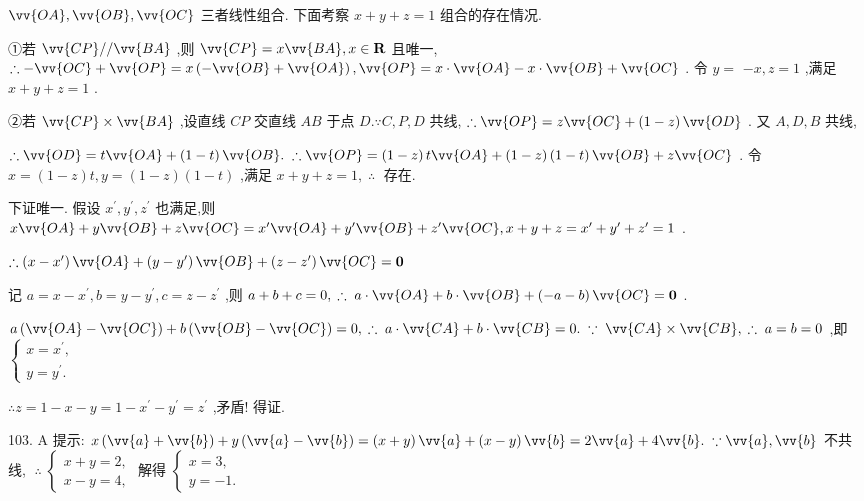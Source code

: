 $\vv{OA},\vv{OB},\vv{OC}$ 三者线性组合. 下面考察 $x + y + z = 1$ 组合的存在情况.

①若 $\vv{CP}//\vv{BA}$ ,则 $\vv{CP} = x\vv{BA},x \in  \mathbf{R}$ 且唯一, $\therefore  - \vv{OC} + \vv{OP} = x\left( {-\vv{OB} + \vv{OA}}\right) ,\vv{OP} = x \cdot  \vv{OA} - x \cdot  \vv{OB} + \vv{OC}$ . 令 $y =$  $- x,z = 1$ ,满足 $x + y + z = 1$ .

②若 $\vv{CP} \times  \vv{BA}$ ,设直线 ${CP}$ 交直线 ${AB}$ 于点 $D.\because C,P,D$ 共线, $\therefore \vv{OP} = z\vv{OC} + \left( {1 - z}\right) \vv{OD}$ . 又 $A,D,B$ 共线,

$\therefore \vv{OD} = t\vv{OA} + \left( {1 - t}\right) \vv{OB}.\;\therefore \vv{OP} = \left( {1 - z}\right) t\vv{OA} + \left( {1 - z}\right) \left( {1 - t}\right) \vv{OB} + z\vv{OC}$ . 令 $x = \left( {1 - z}\right) t,y = \left( {1 - z}\right) \left( {1 - t}\right)$ ,满足 $x + y + z = 1,\;\therefore \;$ 存在.

下证唯一. 假设 ${x}^{\prime },{y}^{\prime },{z}^{\prime }$ 也满足,则 $x\vv{OA} + y\vv{OB} + z\vv{OC} = {x}^{\prime }\vv{OA} + {y}^{\prime }\vv{OB} + {z}^{\prime }\vv{OC},x + y + z = {x}^{\prime } + {y}^{\prime } + {z}^{\prime } = 1$ .

$\therefore \left( {x - {x}^{\prime }}\right) \vv{OA} + \left( {y - {y}^{\prime }}\right) \vv{OB} + \left( {z - {z}^{\prime }}\right) \vv{OC} = \mathbf{0}$

记 $a = x - {x}^{\prime },b = y - {y}^{\prime },c = z - {z}^{\prime }$ ,则 $a + b + c = 0,\;\therefore \;a \cdot  \vv{OA} + b \cdot  \vv{OB} + \left( {-a - b}\right) \vv{OC} = \mathbf{0}$ .

$a\left( {\vv{OA} - \vv{OC}}\right)  + b\left( {\vv{OB} - \vv{OC}}\right)  = 0,\;\therefore \;a \cdot  \vv{CA} + b \cdot  \vv{CB} = 0.\;\because \;\vv{CA} \times  \vv{CB},\;\therefore \;a = b = 0$ ,即 $\left\{  \begin{array}{l} x = {x}^{\prime }, \\  y = {y}^{\prime }. \end{array}\right.$

$\therefore z = 1 - x - y = 1 - {x}^{\prime } - {y}^{\prime } = {z}^{\prime }$ ,矛盾! 得证.

103. A 提示: $x\left( {\vv{a} + \vv{b}}\right)  + y\left( {\vv{a} - \vv{b}}\right)  = \left( {x + y}\right) \vv{a} + \left( {x - y}\right) \vv{b} = 2\vv{a} + 4\vv{b}.\;\because \vv{a},\vv{b}$ 不共线, $\;\therefore \;\left\{  \begin{array}{l} x + y = 2, \\  x - y = 4, \end{array}\right.$ 解得 $\left\{  \begin{array}{l} x = 3, \\  y =  - 1. \end{array}\right.$

